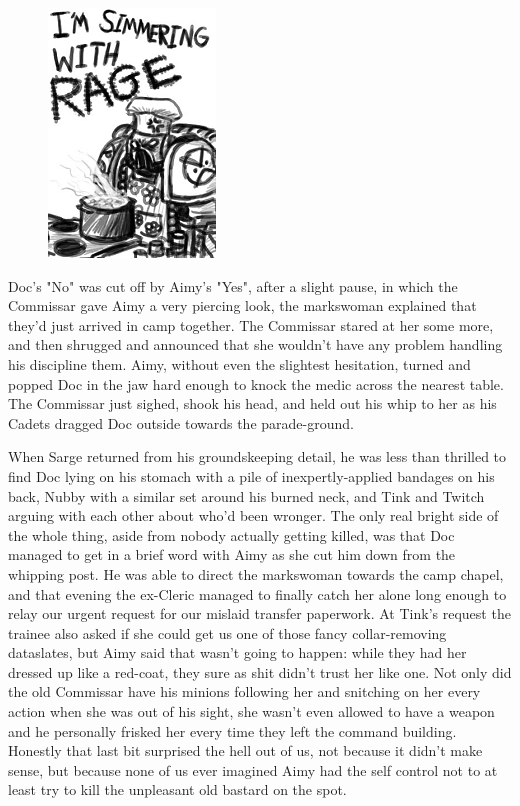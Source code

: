 \begin{figure}
	\begin{center}
		\includegraphics[width=\figwidth]{pics/21/31.png}
	\end{center}
\end{figure}
Doc's "No" was cut off by Aimy's "Yes", after a slight pause, in which the Commissar gave Aimy a very piercing look, the markswoman explained that they'd just arrived in camp together. 
The Commissar stared at her some more, and then shrugged and announced that she wouldn't have any problem handling his discipline them. 
Aimy, without even the slightest hesitation, turned and popped Doc in the jaw hard enough to knock the medic across the nearest table. 
The Commissar just sighed, shook his head, and held out his whip to her as his Cadets dragged Doc outside towards the parade-ground.

When Sarge returned from his groundskeeping detail, he was less than thrilled to find Doc lying on his stomach with a pile of inexpertly-applied bandages on his back, Nubby with a similar set around his burned neck, and Tink and Twitch arguing with each other about who'd been wronger. 
The only real bright side of the whole thing, aside from nobody actually getting killed, was that Doc managed to get in a brief word with Aimy as she cut him down from the whipping post. 
He was able to direct the markswoman towards the camp chapel, and that evening the ex-Cleric managed to finally catch her alone long enough to relay our urgent request for our mislaid transfer paperwork. 
At Tink's request the trainee also asked if she could get us one of those fancy collar-removing dataslates, but Aimy said that wasn't going to happen: 
while they had her dressed up like a red-coat, they sure as shit didn't trust her like one. 
Not only did the old Commissar have his minions following her and snitching on her every action when she was out of his sight, she wasn't even allowed to have a weapon and he personally frisked her every time they left the command building. 
Honestly that last bit surprised the hell out of us, not because it didn't make sense, but because none of us ever imagined Aimy had the self control not to at least try to kill the unpleasant old bastard on the spot.

